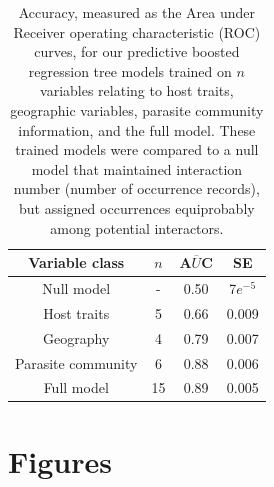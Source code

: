 \documentclass[12pt]{article}
\begin{document}
\newpage
 \begin{table}[!h]
  \caption{Accuracy, measured as the Area under Receiver operating characteristic (ROC) curves, for our predictive boosted regression tree models trained on $n$ variables relating to host traits, geographic variables, parasite community information, and the full model. These trained models were compared to a null model that maintained interaction number (number of occurrence records), but assigned occurrences equiprobably among potential interactors.}
  \vspace{0.2cm}
  \begin{tabular}{cccc}
\hline
{Variable class} &   {$n$} &   {A$\overline{U}$C} &  {SE} \\ 
\hline

  Null model  &  -   &  0.50  & 7$e^{-5}$ \\
  Host traits & 5 & 0.66 & 0.009 \\
  Geography & 4 & 0.79 & 0.007 \\
  Parasite community & 6 & 0.88  & 0.006  \\
  Full model & 15 & 0.89  & 0.005   \\
  
\hline
  \end{tabular}
 \label{tab:brtAccuracy}
\end{table}

   
   

\newpage
\section{Figures}
\end{document}
